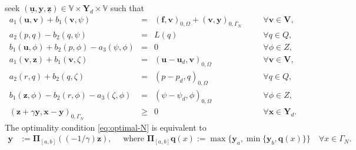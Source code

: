 \documentclass[smallextended]{svjour3}
\numberwithin{equation}{section}
\numberwithin{figure}{section}
\numberwithin{table}{section}
\newcommand\bV{\mathbf{V}}
\newcommand\bPi{\boldsymbol{\Pi}}
\newcommand\ff{\boldsymbol{f}}
\newcommand\buu{\underline{\boldsymbol{u}}}
\newcommand\buz{\underline{\boldsymbol{z}}}
\newcommand\bx{\boldsymbol{x}}
\newcommand\by{\boldsymbol{y}}
\newcommand\bu{\boldsymbol{u}}
\newcommand\bv{\boldsymbol{v}}
\newcommand\bz{\boldsymbol{z}}
\newcommand{\bYd}{\boldsymbol{Y}_d}
\newcommand{\bbV}{\mathbb{V}}
\newcommand{\cblue}[1]{\textcolor{blue}{#1}}
\begin{document}
	seek  $(\buu, \by, \buz) \in \bbV \times \bYd\times \bbV $ 
	 such that
	\begin{subequations} \label{eq:weak-N}
		\begin{alignat}{6}
			a_1(\bu, \bv)  +  b_1(\bv, \psi) &= & (\ff,\bv)_{0, \Omega} + (\bv, \by )_{0, \Gamma_N}  & \quad & \forall \bv \in \bV, \label{eq:weak-N-a}\\
			a_2(p,q) - b_2(q,\psi) & = & L(q)  \qquad \quad & \quad & \forall q \in Q, \label{eq:weak-N-b}\\
			b_1(\bu, \phi)  + b_2(p,\phi) - a_3(\psi, \phi) & =& 0  \qquad \qquad& \quad & \forall \phi \in Z, \label{eq:weak-N-c}\\
			a_1(\bv, \bz) +  b_1(\bv, \zeta)     &=&
            (\bu - \bu_d, \bv)_{0, \Omega}
            \,  &\quad&\forall \bv \in \bV, \label{eq:weak-N-d}\\
			a_2(r,q)  +  b_2(q,\zeta)  &=& 
            ( p - p_d, q)_{0, \Omega}
            \, &\quad&\forall q \in Q, \label{eq:weak-N-e} \\
			b_1(\bz, \phi) - b_2(r,\phi) -  a_3(\zeta, \phi)  &=& 
            (\psi- \psi_d, \phi)_{0, \Omega}
            \,  &\quad&\forall \phi \in Z, \label{eq:weak-N-f} \\
			(\bz + \gamma \by, \bx - \by )_{0,\Gamma_N} &\ge& 0 \qquad \qquad&\quad& \forall \bx \in \bYd. \label{eq:optimal-N}
		\end{alignat}
	\end{subequations}
	The optimality condition \eqref{eq:optimal-N} is equivalent to 
	\begin{align*}
		\by & := \bPi_{[a,b]} \left( \left({-1}/{\gamma}\right) \bz  \right), \quad \text{ where } \bPi_{[a,b]} \boldsymbol{q}(x):= \max \{ \by_a, \min\{ \by_b, \boldsymbol{q}(x) \}\} \quad \forall x \in \Gamma_N.
	\end{align*}

\end{document}
